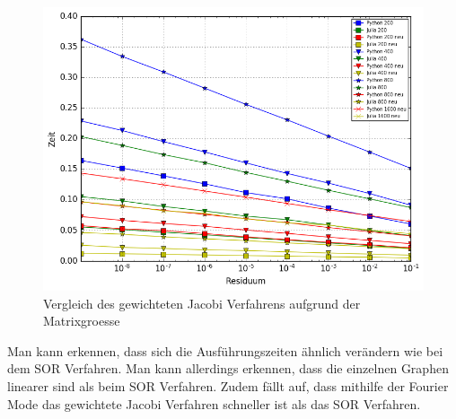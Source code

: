 \documentclass[a4paper, 11pt]{article}
\begin{document}
\begin{figure}[h]
	\centering
	\includegraphics[width=1\textwidth]{Jacobineu.png}
	\caption{Vergleich des gewichteten Jacobi Verfahrens aufgrund der Matrixgroesse}
	\label{img:Bild4}
\end{figure}
Man kann erkennen, dass sich die Ausf\"uhrungszeiten \"ahnlich ver\"andern wie bei dem SOR Verfahren. Man kann allerdings erkennen, dass die einzelnen Graphen linearer sind als beim SOR Verfahren. Zudem f\"allt auf, dass mithilfe der 
Fourier Mode das gewichtete Jacobi Verfahren schneller ist als das SOR Verfahren.

\newpage
\end{document}
